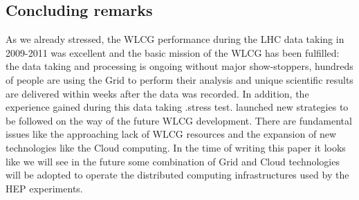 \subsection{Concluding remarks}

 As we already stressed, the WLCG performance
during the LHC data taking in 2009-2011 was excellent and the basic
mission of the WLCG has been fulfilled: the data taking and
processing is ongoing without major show-stoppers, hundreds of
people are using the Grid to perform their analysis and unique
scientific results are delivered within weeks after the data was
recorded. In addition, the experience gained during this data taking
.stress test. launched new strategies to be followed on the way of
the future WLCG development. There are fundamental issues like the
approaching lack of WLCG resources and the expansion of new
technologies like the Cloud computing. In the time of writing this
paper it looks like we will see in the future some combination of
Grid and Cloud technologies will be adopted to operate the
distributed computing infrastructures used by the HEP experiments.

